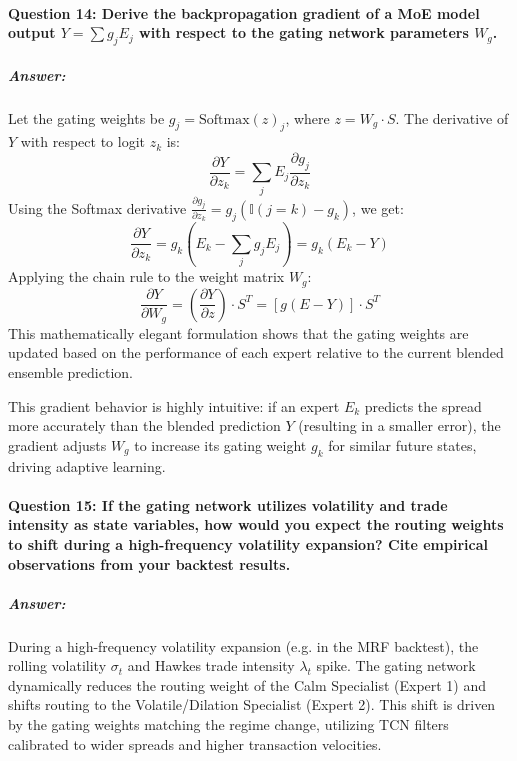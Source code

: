 \documentclass[11pt,a4paper]{article}
\begin{document}
\paragraph{Question 14: Derive the backpropagation gradient of a MoE model output $Y = \sum g_j E_j$ with respect to the gating network parameters $W_g$.}
\subparagraph{Answer:}
Let the gating weights be $g_j = \text{Softmax}(z)_j$, where $z = W_g \cdot S$. The derivative of $Y$ with respect to logit $z_k$ is:
\begin{equation}
    \frac{\partial Y}{\partial z_k} = \sum_{j} E_j \frac{\partial g_j}{\partial z_k}
\end{equation}
Using the Softmax derivative $\frac{\partial g_j}{\partial z_k} = g_j (\mathbb{I}(j=k) - g_k)$, we get:
\begin{equation}
    \frac{\partial Y}{\partial z_k} = g_k \left( E_k - \sum_j g_j E_j \right) = g_k \left( E_k - Y \right)
\end{equation}
Applying the chain rule to the weight matrix $W_g$:
\begin{equation}
    \frac{\partial Y}{\partial W_g} = \left( \frac{\partial Y}{\partial z} \right) \cdot S^T = \left[ g(E - Y) \right] \cdot S^T
\end{equation}
This mathematically elegant formulation shows that the gating weights are updated based on the performance of each expert relative to the current blended ensemble prediction.

This gradient behavior is highly intuitive: if an expert $E_k$ predicts the spread more accurately than the blended prediction $Y$ (resulting in a smaller error), the gradient adjusts $W_g$ to increase its gating weight $g_k$ for similar future states, driving adaptive learning.

\paragraph{Question 15: If the gating network utilizes volatility and trade intensity as state variables, how would you expect the routing weights to shift during a high-frequency volatility expansion? Cite empirical observations from your backtest results.}
\subparagraph{Answer:}
During a high-frequency volatility expansion (e.g. in the MRF backtest), the rolling volatility $\sigma_t$ and Hawkes trade intensity $\lambda_t$ spike. The gating network dynamically reduces the routing weight of the Calm Specialist (Expert 1) and shifts routing to the Volatile/Dilation Specialist (Expert 2). This shift is driven by the gating weights matching the regime change, utilizing TCN filters calibrated to wider spreads and higher transaction velocities.
\end{document}

